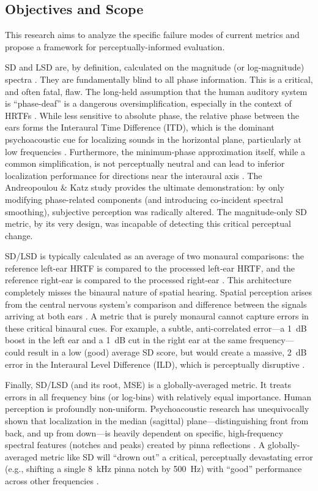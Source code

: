 \documentclass[12pt,a4paper]{article}
\begin{document}
\subsection{Objectives and Scope}

This research aims to analyze the specific failure modes of current metrics and propose a framework for perceptually-informed evaluation.

SD and LSD are, by definition, calculated on the magnitude (or log-magnitude) spectra \cite{hrtf_measure_review2020}. They are fundamentally blind to all phase information. This is a critical, and often fatal, flaw. The long-held assumption that the human auditory system is ``phase-deaf'' is a dangerous oversimplification, especially in the context of HRTFs \cite{blauert1997}. While less sensitive to absolute phase, the relative phase between the ears forms the Interaural Time Difference (ITD), which is the dominant psychoacoustic cue for localizing sounds in the horizontal plane, particularly at low frequencies \cite{audloc2024}. Furthermore, the minimum-phase approximation itself, while a common simplification, is not perceptually neutral and can lead to inferior localization performance for directions near the interaural axis \cite{kulkarni1998}. The Andreopoulou \& Katz study \cite{andreopoulou2022} provides the ultimate demonstration: by only modifying phase-related components (and introducing co-incident spectral smoothing), subjective perception was radically altered. The magnitude-only SD metric, by its very design, was incapable of detecting this critical perceptual change.

SD/LSD is typically calculated as an average of two monaural comparisons: the reference left-ear HRTF is compared to the processed left-ear HRTF, and the reference right-ear is compared to the processed right-ear \cite{hrtf_measure_review2020}. This architecture completely misses the binaural nature of spatial hearing. Spatial perception arises from the central nervous system's comparison and difference between the signals arriving at both ears \cite{audloc2024}. A metric that is purely monaural cannot capture errors in these critical binaural cues. For example, a subtle, anti-correlated error---a 1~dB boost in the left ear and a 1~dB cut in the right ear at the same frequency---could result in a low (good) average SD score, but would create a massive, 2~dB error in the Interaural Level Difference (ILD), which is perceptually disruptive \cite{blauert1997}.

Finally, SD/LSD (and its root, MSE) is a globally-averaged metric. It treats errors in all frequency bins (or log-bins) with relatively equal importance. Human perception is profoundly non-uniform. Psychoacoustic research has unequivocally shown that localization in the median (sagittal) plane---distinguishing front from back, and up from down---is heavily dependent on specific, high-frequency spectral features (notches and peaks) created by pinna reflections \cite{audloc2024}. A globally-averaged metric like SD will ``drown out'' a critical, perceptually devastating error (e.g., shifting a single 8~kHz pinna notch by 500~Hz) with ``good'' performance across other frequencies \cite{andreopoulou_icmc2014}.
\end{document}
